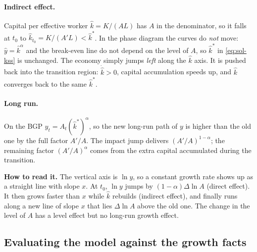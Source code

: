 \paragraph{Indirect effect.} Capital per effective worker $\hat k=K/(AL)$ has $A$ in the denominator, so it falls at $t_0$ to $\hat k_{t_0}=K/(A'L)<\hat k^{*}$. In the phase diagram the curves do \emph{not} move: $\hat y=\hat k^{\alpha}$ and the break-even line do not depend on the level of $A$, so $\hat k^{*}$ in \eqref{eq:sol-kss} is unchanged. The economy simply jumps \emph{left} along the $\hat k$ axis. It is pushed back into the transition region: $\dot{\hat k}>0$, capital accumulation speeds up, and $\hat k$ converges back to the same $\hat k^{*}$.

\paragraph{Long run.} On the BGP $y_t=A_t(\hat k^*)^{\alpha}$, so the new long-run path of $y$ is higher than the old one by the full factor $A'/A$. The impact jump delivers $(A'/A)^{1-\alpha}$; the remaining factor $(A'/A)^{\alpha}$ comes from the extra capital accumulated during the transition.

\begin{center}
\end{center}
\textbf{How to read it.} The vertical axis is $\ln y$, so a constant growth rate shows up as a straight line with slope $x$. At $t_0$, $\ln y$ jumps by $(1-\alpha)\Delta\ln A$ (direct effect). It then grows faster than $x$ while $\hat k$ rebuilds (indirect effect), and finally runs along a new line of slope $x$ that lies $\Delta\ln A$ above the old one. The change in the level of $A$ has a level effect but no long-run growth effect.

\subsection{Evaluating the model against the growth facts }\label{sec:sol-eval}

